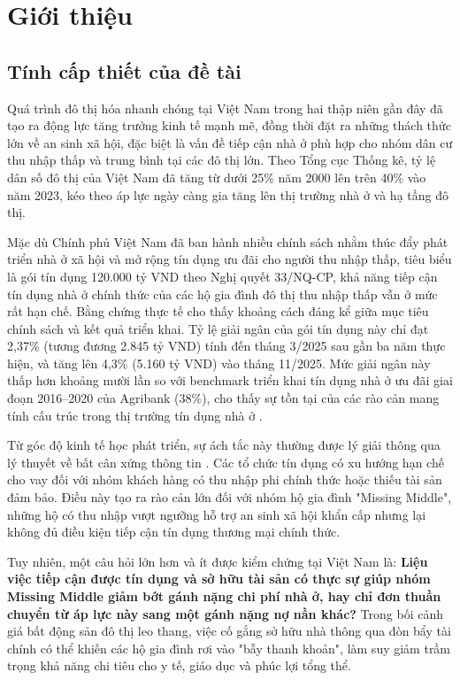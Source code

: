 \documentclass[12pt,a4paper]{report}
\begin{document}
	\chapter{Giới thiệu}
	
	\section{Tính cấp thiết của đề tài}
	
	Quá trình đô thị hóa nhanh chóng tại Việt Nam trong hai thập niên gần đây đã tạo ra động lực tăng trưởng kinh tế mạnh mẽ, đồng thời đặt ra những thách thức lớn về an sinh xã hội, đặc biệt là vấn đề tiếp cận nhà ở phù hợp cho nhóm dân cư thu nhập thấp và trung bình tại các đô thị lớn. Theo Tổng cục Thống kê, tỷ lệ dân số đô thị của Việt Nam đã tăng từ dưới 25\% năm 2000 lên trên 40\% vào năm 2023, kéo theo áp lực ngày càng gia tăng lên thị trường nhà ở và hạ tầng đô thị.
	
	Mặc dù Chính phủ Việt Nam đã ban hành nhiều chính sách nhằm thúc đẩy phát triển nhà ở xã hội và mở rộng tín dụng ưu đãi cho người thu nhập thấp, tiêu biểu là gói tín dụng 120.000 tỷ VND theo Nghị quyết 33/NQ-CP, khả năng tiếp cận tín dụng nhà ở chính thức của các hộ gia đình đô thị thu nhập thấp vẫn ở mức rất hạn chế. Bằng chứng thực tế cho thấy khoảng cách đáng kể giữa mục tiêu chính sách và kết quả triển khai. Tỷ lệ giải ngân của gói tín dụng này chỉ đạt 2,37\% (tương đương 2.845 tỷ VND) tính đến tháng 3/2025 sau gần ba năm thực hiện, và tăng lên 4,3\% (5.160 tỷ VND) vào tháng 11/2025. Mức giải ngân này thấp hơn khoảng mười lần so với benchmark triển khai tín dụng nhà ở ưu đãi giai đoạn 2016–2020 của Agribank (38\%), cho thấy sự tồn tại của các rào cản mang tính cấu trúc trong thị trường tín dụng nhà ở \parencite{CafeLand2025,CafeF2025,SBV2025}. 
	
	Từ góc độ kinh tế học phát triển, sự ách tắc này thường được lý giải thông qua lý thuyết về bất cân xứng thông tin \parencite{Stiglitz1981}. Các tổ chức tín dụng có xu hướng hạn chế cho vay đối với nhóm khách hàng có thu nhập phi chính thức hoặc thiếu tài sản đảm bảo. Điều này tạo ra rào cản lớn đối với nhóm hộ gia đình "Missing Middle", những hộ có thu nhập vượt ngưỡng hỗ trợ an sinh xã hội khẩn cấp nhưng lại không đủ điều kiện tiếp cận tín dụng thương mại chính thức.
	
	Tuy nhiên, một câu hỏi lớn hơn và ít được kiểm chứng tại Việt Nam là: \textbf{Liệu việc tiếp cận được tín dụng và sở hữu tài sản có thực sự giúp nhóm Missing Middle giảm bớt gánh nặng chi phí nhà ở, hay chỉ đơn thuần chuyển từ áp lực này sang một gánh nặng nợ nần khác?} Trong bối cảnh giá bất động sản đô thị leo thang, việc cố gắng sở hữu nhà thông qua đòn bẩy tài chính có thể khiến các hộ gia đình rơi vào "bẫy thanh khoản", làm suy giảm trầm trọng khả năng chi tiêu cho y tế, giáo dục và phúc lợi tổng thể.
	
\end{document}
